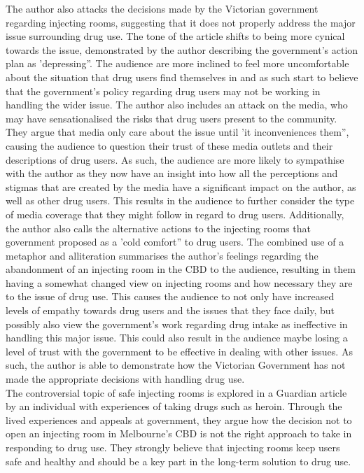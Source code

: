 \documentclass[a4paper]{article}
\begin{document}
The author also attacks the decisions made by the Victorian government regarding injecting rooms, suggesting that it does not properly address the major issue surrounding drug use. The tone of the article shifts to being more cynical towards the issue, demonstrated by the author describing the government’s action plan as 'depressing”. The audience are more inclined to feel more uncomfortable about the situation that drug users find themselves in and as such start to believe that the government’s policy regarding drug users may not be working in handling the wider issue. The author also includes an attack on the media, who may have sensationalised the risks that drug users present to the community. They argue that media only care about the issue until 'it inconveniences them”, causing the audience to question their trust of these media outlets and their descriptions of drug users. As such, the audience are more likely to sympathise with the author as they now have an insight into how all the perceptions and stigmas that are created by the media have a significant impact on the author, as well as other drug users. This results in the audience to further consider the type of media coverage that they might follow in regard to drug users. Additionally, the author also calls the alternative actions to the injecting rooms that government proposed as a 'cold comfort” to drug users. The combined use of a metaphor and alliteration summarises the author’s feelings regarding the abandonment of an injecting room in the CBD to the audience, resulting in them having a somewhat changed view on injecting rooms and how necessary they are to the issue of drug use. This causes the audience to not only have increased levels of empathy towards drug users and the issues that they face daily, but possibly also view the government’s work regarding drug intake as ineffective in handling this major issue. This could also result in the audience maybe losing a level of trust with the government to be effective in dealing with other issues. As such, the author is able to demonstrate how the Victorian Government has not made the appropriate decisions with handling drug use.\\

The controversial topic of safe injecting rooms is explored in a Guardian article by an individual with experiences of taking drugs such as heroin. Through the lived experiences and appeals at government, they argue how the decision not to open an injecting room in Melbourne’s CBD is not the right approach to take in responding to drug use. They strongly believe that injecting rooms keep users safe and healthy and should be a key part in the long-term solution to drug use.\\
\end{document}

